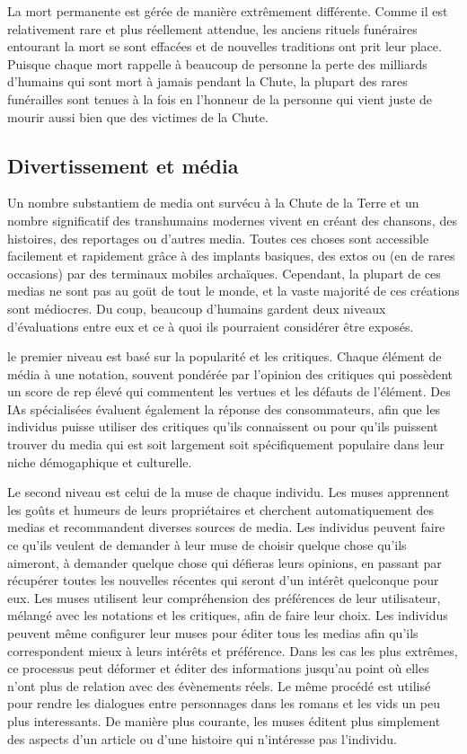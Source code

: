 La mort permanente est gérée de manière extrêmement différente. Comme il est relativement rare et plus réellement attendue, les anciens rituels funéraires entourant la mort se sont effacées et de nouvelles traditions ont prit leur place. Puisque chaque mort rappelle à beaucoup de personne la perte des milliards d'humains qui sont mort à jamais pendant la Chute, la plupart des rares funérailles sont tenues à la fois en l'honneur de la personne qui vient juste de mourir aussi bien que des victimes de la Chute. 

\subsection{Divertissement et média} \label{sec:entertainment-media} 

Un nombre substantiem de media ont survécu à la Chute de la Terre et un nombre significatif des transhumains modernes vivent en créant des chansons, des histoires, des reportages ou d'autres media. Toutes ces choses sont accessible facilement et rapidement grâce à des implants basiques, des extos ou (en de rares occasions) par des terminaux mobiles archaïques. Cependant, la plupart de ces medias ne sont pas au goüt de tout le monde, et la vaste majorité de ces créations sont médiocres. Du coup, beaucoup d'humains gardent deux niveaux d'évaluations entre eux et ce à quoi ils pourraient considérer être exposés. 

le premier niveau est basé sur la popularité et les critiques. Chaque élément de média à une notation, souvent pondérée par l'opinion des critiques qui possèdent un score de rep élevé qui commentent les vertues et les défauts de l'élément. Des IAs spécialisées évaluent également la réponse des consommateurs, afin que les individus puisse utiliser des critiques qu'ils connaissent ou pour qu'ils puissent trouver du media qui est soit largement soit spécifiquement populaire dans leur niche démogaphique et culturelle. 

Le second niveau est celui de la muse de chaque individu. Les muses apprennent les goûts et humeurs de leurs propriétaires et cherchent automatiquement des medias et recommandent diverses sources de media. Les individus peuvent faire ce qu'ils veulent de demander à leur muse de choisir quelque chose qu'ils aimeront, à demander quelque chose qui défieras leurs opinions, en passant par récupérer toutes les nouvelles récentes qui seront d'un intérêt quelconque pour eux. Les muses utilisent leur compréhension des préférences de leur utilisateur, mélangé avec les notations et les critiques, afin de faire leur choix. Les individus peuvent même configurer leur muses pour éditer tous les medias afin qu'ils correspondent mieux à leurs intérêts et préférence. Dans les cas les plus extrêmes, ce processus peut déformer et éditer des informations jusqu'au point où elles n'ont plus de relation avec des évènements réels. Le même procédé est utilisé pour rendre les dialogues entre personnages dans les romans et les vids un peu plus interessants. De manière plus courante, les muses éditent plus simplement des aspects d'un article ou d'une histoire qui n'intéresse pas l'individu. 

